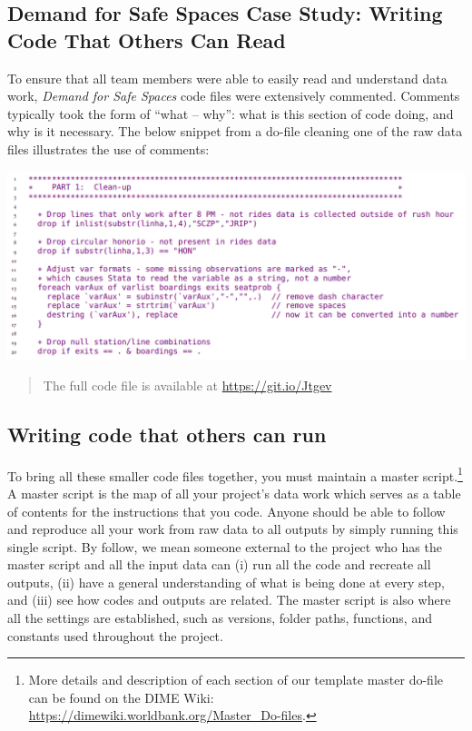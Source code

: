 \documentclass[
]{book}
\begin{document}
\begin{ex}
\hypertarget{demand-for-safe-spaces-case-study-writing-code-that-others-can-read}{%
\subsection*{Demand for Safe Spaces Case Study: Writing Code That Others Can Read}\label{demand-for-safe-spaces-case-study-writing-code-that-others-can-read}}

To ensure that all team members were able to easily read and understand data work, \emph{Demand for Safe Spaces} code files were extensively commented. Comments typically took the form of ``what -- why'': what is this section of code doing, and why is it necessary. The below snippet from a do-file cleaning one of the raw data files illustrates the use of comments:

\includegraphics{examples/ch2-writing-code-that-others-can-read.png}

\begin{quote}
The full code file is available at \url{https://git.io/Jtgev}
\end{quote}
\end{ex}

\hypertarget{writing-code-that-others-can-run}{%
\subsection*{Writing code that others can run}\label{writing-code-that-others-can-run}}

To bring all these smaller code files together, you must maintain a master script.\footnote{More details and description of each section of our template master do-file
  can be found on the DIME Wiki:
  \url{https://dimewiki.worldbank.org/Master_Do-files}.}
A master script is the map of all your project's data work
which serves as a table of contents for the instructions that you code.
Anyone should be able to follow and reproduce all your work from
raw data to all outputs by simply running this single script.
By follow, we mean someone external to the project who has the master script and all the input data can
(i) run all the code and recreate all outputs,
(ii) have a general understanding of what is being done at every step, and
(iii) see how codes and outputs are related.
The master script is also where all the settings are established,
such as versions, folder paths, functions, and constants used throughout the project.
\end{document}
